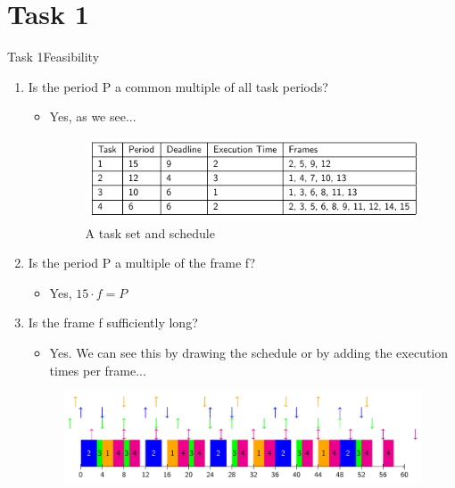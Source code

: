 
\section{Task 1}

\setcounter{task}{1}

\begin{frame}[allowframebreaks]{Task 1}{Feasibility\vspace{0.5cm}}
  \begin{enumerate}
    \item Is the period P a common multiple of all task periods?
      \begin{itemize}
        \item Yes, as we see...
        \begin{figure}
          \centering
          \includegraphics[width=0.7\paperwidth]{./figures/task1_table1.png}
          \caption{A task set and schedule}
        \end{figure}
      \end{itemize}
    \item Is the period P a multiple of the frame f?
      \begin{itemize}
        \item Yes, $15 \cdot f = P$
      \end{itemize}
    \item Is the frame f sufficiently long?
      \begin{itemize}
        \item Yes. We can see this by drawing the schedule or by adding the execution times per frame...
      \end{itemize}
      \begin{figure}
        \centering
        \includegraphics[width=0.7\paperwidth]{./figures/task1_schedule.png}

\end{figure}
\end{enumerate}
\end{frame}
